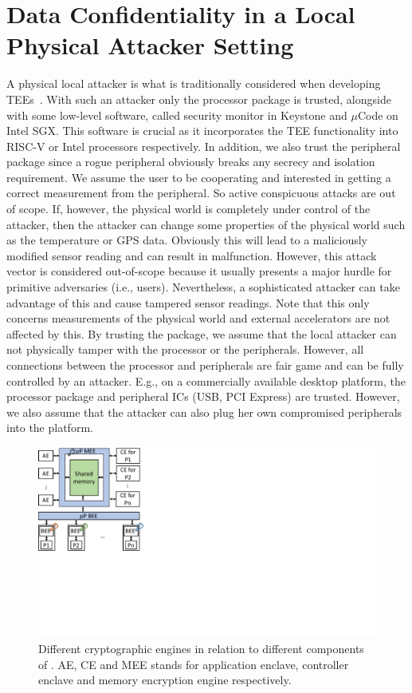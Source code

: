 
\section{Data Confidentiality in a Local Physical Attacker Setting}
\label{pie:sec:localAttacker}


A physical local attacker is what is traditionally considered when developing TEEs~\cite{costan2016intel,keystone}. With such an attacker only the processor package is trusted, alongside with some low-level software, called security monitor in Keystone and $\mu$Code on Intel SGX. This software is crucial as it incorporates the TEE functionality into RISC-V or Intel processors respectively. In addition, we also trust the peripheral package since a rogue peripheral obviously breaks any secrecy and isolation requirement. We assume the user to be cooperating and interested in getting a correct measurement from the peripheral. So active conspicuous attacks are out of scope.  If, however, the physical world is completely under control of the attacker, then the attacker can change some properties of the physical world such as the temperature or GPS data. Obviously this will lead to a maliciously modified sensor reading and can result in malfunction. However, this attack vector is considered out-of-scope because it usually presents a major hurdle for primitive adversaries (i.e., users). Nevertheless, a sophisticated attacker can take advantage of this and cause tampered sensor readings. Note that this only concerns measurements of the physical world and external accelerators are not affected by this. By trusting the package, we assume that the local attacker can not physically tamper with the processor or the peripherals. However, all connections between the processor and peripherals are fair game and can be fully controlled by an attacker. E.g., on a commercially available desktop platform, the processor package and peripheral ICs (USB, PCI Express) are trusted. However, we also assume that the attacker can also plug her own compromised peripherals into the platform. 



  \begin{figure}[tbp]
   \centering
   \includegraphics[trim={0 8.5cm 23cm 0}, clip, width=0.5\linewidth]{chapters/PIE/images/memoryEnc.pdf}
   \caption[Different cryptographic engines in \name]{Different cryptographic engines in relation to different components of \name. AE, CE and MEE stands for application enclave, controller enclave and memory encryption engine respectively.}
   \label{fig:encEngine}
  \end{figure}

